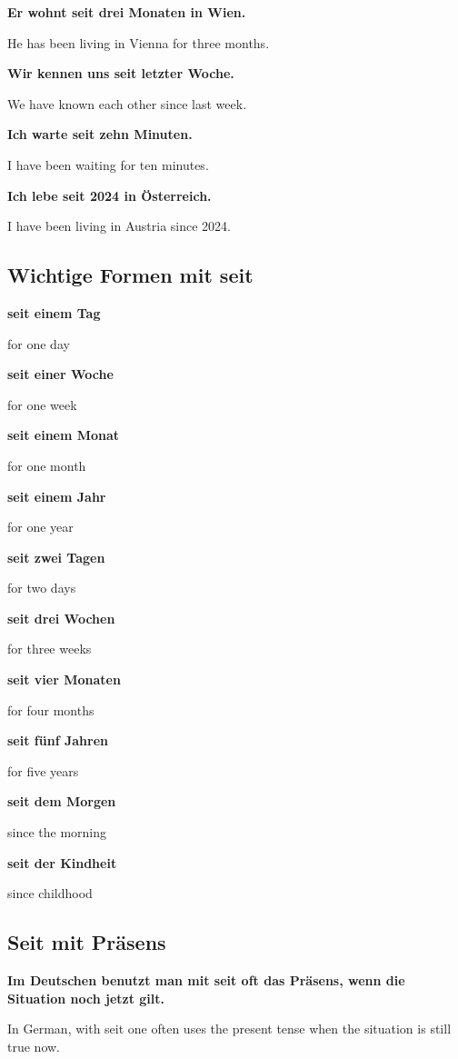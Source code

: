 \documentclass[a4paper]{article}
\newcommand{\EN}[1]{\par{\small\textcolor{TranslationGray}{#1}}\vspace{0.4em}}
\begin{document}
            \textbf{Er wohnt seit drei Monaten in Wien.}
            \EN{He has been living in Vienna for three months.}
            
            \textbf{Wir kennen uns seit letzter Woche.}
            \EN{We have known each other since last week.}
            
            \textbf{Ich warte seit zehn Minuten.}
            \EN{I have been waiting for ten minutes.}
            
            \textbf{Ich lebe seit 2024 in Österreich.}
            \EN{I have been living in Austria since 2024.}
        
        \subsection{Wichtige Formen mit seit}
            
            \textbf{seit einem Tag}
            \EN{for one day}
            
            \textbf{seit einer Woche}
            \EN{for one week}
            
            \textbf{seit einem Monat}
            \EN{for one month}
            
            \textbf{seit einem Jahr}
            \EN{for one year}
            
            \textbf{seit zwei Tagen}
            \EN{for two days}
            
            \textbf{seit drei Wochen}
            \EN{for three weeks}
            
            \textbf{seit vier Monaten}
            \EN{for four months}
            
            \textbf{seit fünf Jahren}
            \EN{for five years}
            
            \textbf{seit dem Morgen}
            \EN{since the morning}
            
            \textbf{seit der Kindheit}
            \EN{since childhood}
        
        \subsection{Seit mit Präsens}
            
            \textbf{Im Deutschen benutzt man mit seit oft das Präsens, wenn die Situation noch jetzt gilt.}
            \EN{In German, with seit one often uses the present tense when the situation is still true now.}
            
\end{document}
